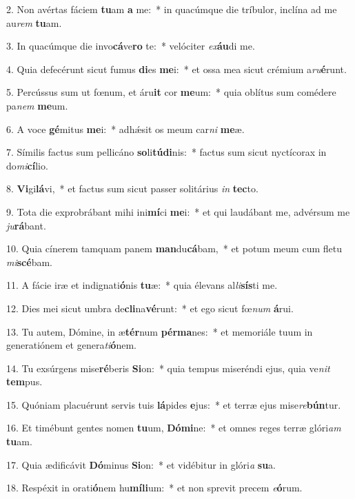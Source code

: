 2. Non avértas fáciem \textbf{tu}am \textbf{a} me:~*  in quacúmque die tríbulor, inclína ad me au\textit{rem} \textbf{tu}am.\

3. In quacúmque die invo\textbf{cá}ve\textbf{ro} te:~*  velóciter \textit{ex}\textbf{áu}di me.\

4. Quia defecérunt sicut fumus \textbf{di}es \textbf{me}i:~*  et ossa mea sicut crémium a\textit{ru}\textbf{é}runt.\

5. Percússus sum ut fœnum, et áru\textbf{it} cor \textbf{me}um:~*  quia oblítus sum comédere pa\textit{nem} \textbf{me}um.\

6. A voce \textbf{gé}mitus \textbf{me}i:~*  adhǽsit os meum car\textit{ni} \textbf{me}æ.\

7. Símilis factus sum pellicáno \textbf{so}li\textbf{tú}\textbf{di}nis:~*  factus sum sicut nyctícorax in do\textit{mi}\textbf{cí}lio.\

8. \textbf{Vi}gi\textbf{lá}vi,~*  et factus sum sicut passer solitárius \textit{in} \textbf{tec}to.\

9. Tota die exprobrábant mihi ini\textbf{mí}ci \textbf{me}i:~*  et qui laudábant me, advérsum me \textit{ju}\textbf{rá}bant.\

10. Quia cínerem tamquam panem \textbf{man}du\textbf{cá}bam,~*  et potum meum cum fletu \textit{mi}\textbf{scé}bam.\

11. A fácie iræ et indignati\textbf{ó}nis \textbf{tu}æ:~*  quia élevans al\textit{li}\textbf{sís}ti me.\

12. Dies mei sicut umbra de\textbf{cli}na\textbf{vé}runt:~*  et ego sicut fœ\textit{num} \textbf{á}rui.\

13. Tu autem, Dómine, in æ\textbf{tér}num \textbf{pér}\textbf{ma}nes:~*  et memoriále tuum in generatiónem et genera\textit{ti}\textbf{ó}nem.\

14. Tu exsúrgens mise\textbf{ré}beris \textbf{Si}on:~*  quia tempus miseréndi ejus, quia ve\textit{nit} \textbf{tem}pus.\

15. Quóniam placuérunt servis tuis \textbf{lá}pides \textbf{e}jus:~*  et terræ ejus mise\textit{re}\textbf{bún}tur.\

16. Et timébunt gentes nomen \textbf{tu}um, \textbf{Dó}\textbf{mi}ne:~*  et omnes reges terræ glóri\textit{am} \textbf{tu}am.\

17. Quia ædificávit \textbf{Dó}minus \textbf{Si}on:~*  et vidébitur in glóri\textit{a} \textbf{su}a.\

18. Respéxit in orati\textbf{ó}nem hu\textbf{mí}\textbf{li}um:~*  et non sprevit precem \textit{e}\textbf{ó}rum.\

